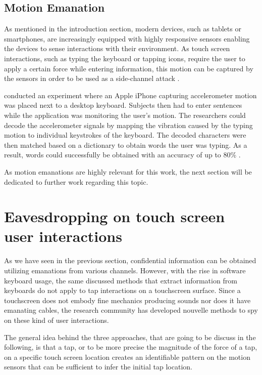 \subsection{Motion Emanation}
As mentioned in the introduction section, modern devices, such as tablets or smartphones, are increasingly equipped with highly responsive sensors enabling the devices to sense interactions with their environment. As touch screen interactions, such as typing the keyboard or tapping icons, require the user to apply a certain force while entering information, this motion can be captured by the sensors in order to be used as a side-channel attack \cite{Tapprints,Accessory,Touchlogger}.

\citeauthor{Marquardt:2011:IDV:2046707.2046771} conducted an experiment where an Apple iPhone capturing accelerometer motion was placed next to a desktop keyboard. Subjects then had to enter sentences while the application was monitoring the user's motion. The researchers could decode the accelerometer signals by mapping the vibration caused by the typing motion to individual keystrokes of the keyboard. The decoded characters were then matched based on a dictionary to obtain words the user was typing. As a result, words could successfully be obtained with an accuracy of up to 80\% \cite{Marquardt:2011:IDV:2046707.2046771}.

As motion emanations are highly relevant for this work, the next section will be dedicated to further work regarding this topic.

\section{Eavesdropping on touch screen user interactions}
As we have seen in the previous section, confidential information can be obtained utilizing emanations from various channels. However, with the rise in software keyboard usage, the same discussed methods that extract information from keyboards do not apply to tap interactions on a touchscreen surface. Since a touchscreen does not embody fine mechanics producing sounds nor does it have emanating cables, the research community has developed nouvelle methods to spy on these kind of user interactions.

The general idea behind the three approaches, that are going to be discuss in the following, is that a tap, or to be more precise the magnitude of the force of a tap, on a specific touch screen location creates an identifiable pattern on the motion sensors that can be sufficient to infer the initial tap location.

